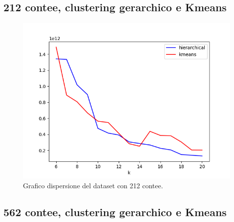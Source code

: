 \documentclass{article}
\begin{document}
\subsection*{212 contee, clustering gerarchico e Kmeans}
\hypertarget{fig:test}{}
\begin{figure}[H]
	\hspace*{-1cm}\begin{minipage}{0.55\linewidth}
	\centering	
	
	\end{minipage}
	\begin{minipage}{0.7\linewidth}
		\includegraphics[width=1.0\linewidth, valign=t]{figures/output562}
		\caption*{Grafico dispersione del dataset con 212 contee.}
	\end{minipage}
\end{figure}
\subsection*{562 contee, clustering gerarchico e Kmeans}
\end{document}
